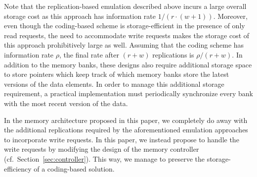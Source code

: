 \begin{remark} Note that the replication-based emulation described above incurs a large overall storage cost as this approach has information rate ${1}/{(r\cdot(w + 1))}$. Moreover, even though the coding-based scheme is storage-efficient in the presence of only read requests, the need to accommodate write requests makes the storage cost of this approach prohibitively large as well. Assuming that the coding scheme has information rate $\rho$, the final rate after $(r + w)$ replications is ${\rho}/{(r + w)}$. In addition to the memory banks, these designs also require additional storage space to store pointers which keep track of which memory banks store the latest versions of the data elements. In order to manage this additional storage requirement, a practical implementation must periodically synchronize every bank with the most recent version of the data.
\end{remark}

In the memory architecture proposed in this paper, we completely do away with the additional replications required by the aforementioned emulation approaches to incorporate write requests. In this paper, we instead propose to handle the write requests by modifying the design of the memory controller (cf.~Section~\ref{sec:controller}). This way, we manage to preserve the storage-efficiency of a coding-based solution.

%

